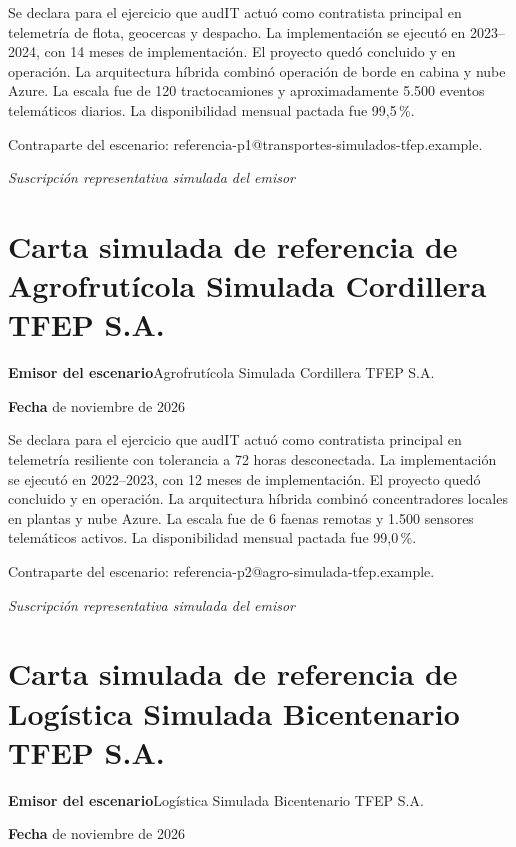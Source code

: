Se declara para el ejercicio que audIT actuó como contratista principal en telemetría de flota, geocercas y despacho. La implementación se ejecutó en 2023--2024, con 14 meses de implementación. El proyecto quedó concluido y en operación. La arquitectura híbrida combinó operación de borde en cabina y nube Azure. La escala fue de 120 tractocamiones y aproximadamente 5.500 eventos telemáticos diarios. La disponibilidad mensual pactada fue 99,5\,\%.

Contraparte del escenario: referencia-p1@transportes-simulados-tfep.example.

\medskip
\noindent\textit{Suscripción representativa simulada del emisor}\par
\label{adm:ref-sur-fin}

\clearpage
\section*{Carta simulada de referencia de Agrofrutícola Simulada Cordillera TFEP S.A.}\label{adm:ref-cordillera}

\rotuloSimuladoSobreUno
\noindent\textbf{Emisor del escenario}\enspace Agrofrutícola Simulada Cordillera TFEP S.A.\par
\noindent\textbf{Fecha} de noviembre de 2026\par
\medskip

Se declara para el ejercicio que audIT actuó como contratista principal en telemetría resiliente con tolerancia a 72 horas desconectada. La implementación se ejecutó en 2022--2023, con 12 meses de implementación. El proyecto quedó concluido y en operación. La arquitectura híbrida combinó concentradores locales en plantas y nube Azure. La escala fue de 6 faenas remotas y 1.500 sensores telemáticos activos. La disponibilidad mensual pactada fue 99,0\,\%.

Contraparte del escenario: referencia-p2@agro-simulada-tfep.example.

\medskip
\noindent\textit{Suscripción representativa simulada del emisor}\par
\label{adm:ref-cordillera-fin}

\clearpage
\section*{Carta simulada de referencia de Logística Simulada Bicentenario TFEP S.A.}\label{adm:ref-bicentenario}

\rotuloSimuladoSobreUno
\noindent\textbf{Emisor del escenario}\enspace Logística Simulada Bicentenario TFEP S.A.\par
\noindent\textbf{Fecha} de noviembre de 2026\par
\medskip


